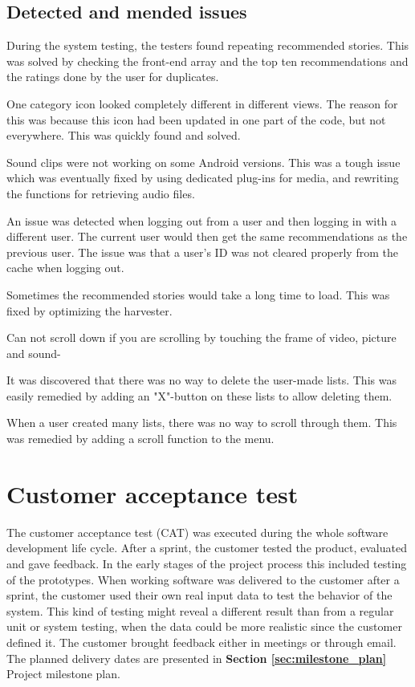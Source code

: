 			
\subsection{Detected and mended issues}

During the system testing, the testers found repeating recommended stories. This was solved by checking the front-end array and the top ten recommendations and the ratings done by the user for duplicates. \newline

One category icon looked completely different in different views. The reason for this was because this icon had been updated in one part of the code, but not everywhere. This was quickly found and solved. \newline

Sound clips were not working on some Android versions. This was a tough issue which was eventually fixed by using dedicated plug-ins for media, and rewriting the functions for retrieving audio files.\newline

An issue was detected when logging out from a user and then logging in with a different user. The current user would then get the same recommendations as the previous user. The issue was that a user's ID was not cleared properly from the cache when logging out. \newline

Sometimes the recommended stories would take a long time to load. This was fixed by optimizing the harvester. \newline

Can not scroll down if you are scrolling by touching the frame of video, picture and sound- \newline

It was discovered that there was no way to delete the user-made lists. This was easily remedied by adding an "X"-button on these lists to allow deleting them. \newline

When a user created many lists, there was no way to scroll through them. This was remedied by adding a scroll function to the menu. \newline

\section{Customer acceptance test}
\label{sec:acceptance_test}

The customer acceptance test (CAT) was executed during the whole software development life cycle. After a sprint, the customer tested the product, evaluated and gave feedback. In the early stages of the project process this included testing of the prototypes. When working software was delivered to the customer after a sprint, the customer used their own real input data to test the behavior of the system. This kind of testing might reveal a different result than from a regular unit or system testing, when the data could be more realistic since the customer defined it. The customer brought feedback either in meetings or through email. The planned delivery dates are presented in \textbf{Section \ref{sec:milestone_plan}} Project milestone plan.  

